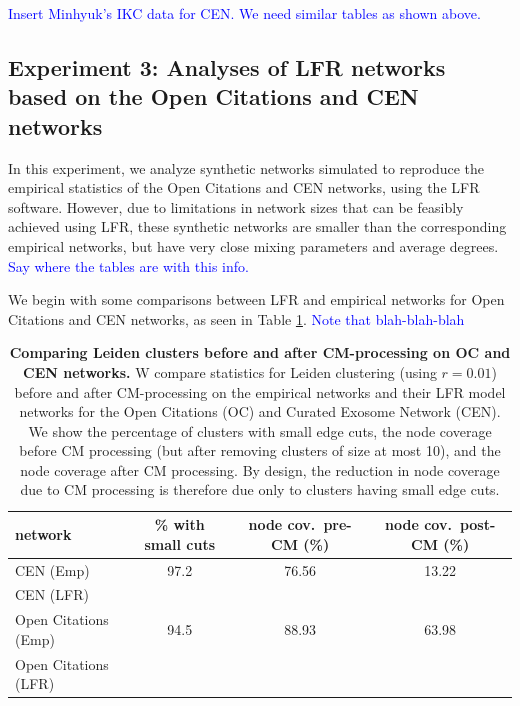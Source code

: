 \documentclass[11pt]{article}   	%
\begin{document}
\textcolor{blue}{Insert Minhyuk's IKC data for CEN. We need similar tables as shown above. }


\subsection{Experiment 3: Analyses of LFR networks based on the Open Citations and CEN networks}



In this experiment, we analyze synthetic networks simulated to reproduce the empirical statistics of the Open Citations and CEN networks, using the 
LFR software. 
However, due to limitations in network sizes that can be feasibly achieved using LFR, these synthetic networks are smaller than the corresponding
empirical networks, but have very close mixing parameters and average degrees. 
\textcolor{blue}{Say where the tables are with this info.}


We begin with some comparisons between LFR and empirical networks for Open Citations and CEN networks, as seen in 
Table \ref{tab:LFR-vs-empirical-OC-CEN}. \textcolor{blue}{Note that blah-blah-blah}
\begin{table}[ht]
\centering
\begin{tabular}{lccc}
  \hline
 network & \% with small cuts & node cov.~pre-CM (\%) & node cov.~post-CM (\%) \\
   \hline
   CEN (Emp) &97.2 &76.56 &13.22 \\
   CEN (LFR) &&& \\
   \hline
   Open Citations (Emp) &94.5&88.93&63.98 \\
   Open Citations (LFR) &&&\\
   \hline
\end{tabular}
\caption{\textbf{Comparing Leiden clusters before and after CM-processing  on   OC and CEN networks.} W compare statistics for Leiden clustering (using $r=0.01$) before and after CM-processing on the empirical networks and their LFR model
networks for the Open Citations (OC)  and Curated Exosome Network (CEN). We show the percentage of clusters with small edge cuts, the node coverage before CM processing (but after removing clusters of size at most 10), and the node coverage
after CM processing.  By design, the reduction in node coverage due to CM processing  is therefore due only to clusters having small edge cuts.}
\label{tab:LFR-vs-empirical-OC-CEN}
\end{table}
\end{document}
